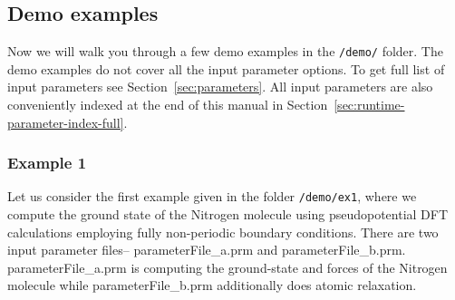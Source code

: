\subsection{Demo examples}
Now we will walk you through a few demo examples in the \verb|/demo/| folder. The demo examples do not cover all the input parameter options. To get full list of input parameters see Section~\ref{sec:parameters}. All input parameters are also conveniently indexed at the end of this manual in Section~\ref{sec:runtime-parameter-index-full}. 
\subsubsection{Example 1}\label{sec:example1}
Let us consider the first example given in the folder
\verb|/demo/ex1|, where we compute the ground state of the Nitrogen molecule using pseudopotential DFT calculations employing fully non-periodic boundary conditions.
There are two input parameter files-- parameterFile\_a.prm and parameterFile\_b.prm. parameterFile\_a.prm is
computing the ground-state and forces of the Nitrogen molecule while parameterFile\_b.prm additionally does atomic relaxation.

